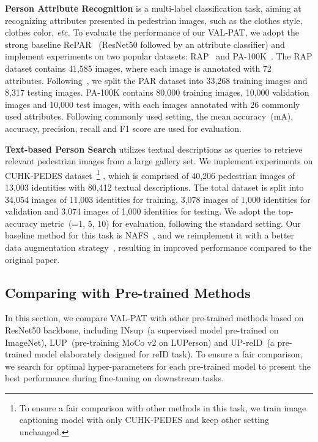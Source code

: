 \documentclass[final]{cvpr}
\begin{document}
\noindent
\textbf{Person Attribute Recognition}
is a multi-label classification task, aiming at recognizing attributes presented in pedestrian images, such as the clothes style, clothes color, \emph{etc.}
To evaluate the performance of our VAL-PAT, we adopt the strong baseline RePAR~\cite{jia2021rethinking} (ResNet50 followed by an attribute classifier) and implement experiments on two popular datasets: RAP~\cite{li2016richly} and PA-100K~\cite{liu2017hydraplus}.
The RAP dataset contains 41,585 images, where each image is annotated with 72 attributes.
Following~\cite{li2016richly}, we split the PAR dataset into 33,268 training images and 8,317 testing images.
PA-100K contains 80,000 training images, 10,000 validation images and 10,000 test images, with each images annotated with 26 commonly used attributes.
Following commonly used setting, the mean accuracy~(mA), accuracy, precision, recall and F1 score are used for evaluation.

\noindent
\textbf{Text-based Person Search} 
utilizes textual descriptions as queries to retrieve relevant pedestrian images from a large gallery set.
We implement experiments on CUHK-PEDES dataset~\cite{li2017person}\footnote{To ensure a fair comparison with other methods in this task, we train image captioning model with only CUHK-PEDES and keep other setting unchanged.}
, which is comprised of 40,206 pedestrian images of 13,003 identities with 80,412 textual descriptions. The total dataset is split into 34,054 images of 11,003 identities for training, 3,078 images of 1,000 identities for validation and 3,074 images of 1,000 identities for testing.
We adopt the top- accuracy metric~(=1, 5, 10) for evaluation, following the standard setting. 
Our baseline method for this task is NAFS~\cite{gao2021contextual}, and we reimplement it with a better data augmentation strategy~\cite{shu2023see}, resulting in improved performance compared to the original paper.


\subsection{Comparing with Pre-trained Methods}
In this section, we compare VAL-PAT with other pre-trained methods based on ResNet50 backbone, including INsup~(a supervised model pre-trained on ImageNet), LUP~(pre-training MoCo v2 on LUPerson) and UP-reID~(a pre-trained model elaborately designed for reID task).
To ensure a fair comparison, we search for optimal hyper-parameters for each pre-trained model to present the best performance during fine-tuning on downstream tasks.
\end{document}
